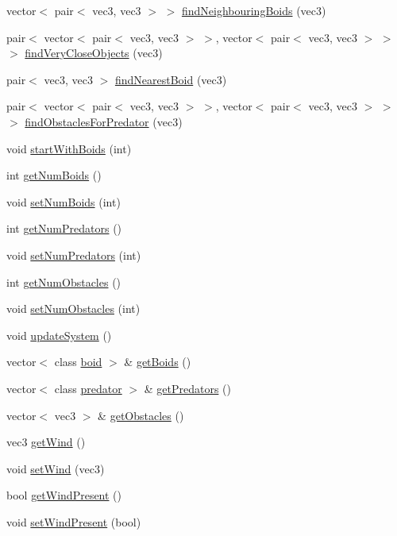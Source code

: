 \begin{DoxyCompactItemize}
\item 
vector$<$ pair$<$ vec3, vec3 $>$ $>$ \mbox{\hyperlink{classsystem_a2325f76474ccd70ecded65ec04816bb8}{find\+Neighbouring\+Boids}} (vec3)
\item 
pair$<$ vector$<$ pair$<$ vec3, vec3 $>$ $>$, vector$<$ pair$<$ vec3, vec3 $>$ $>$ $>$ \mbox{\hyperlink{classsystem_a213116ee6222958bd53c16dad4b49756}{find\+Very\+Close\+Objects}} (vec3)
\item 
pair$<$ vec3, vec3 $>$ \mbox{\hyperlink{classsystem_a3b4275e6878a46041c8fbd16a75dbcd6}{find\+Nearest\+Boid}} (vec3)
\item 
pair$<$ vector$<$ pair$<$ vec3, vec3 $>$ $>$, vector$<$ pair$<$ vec3, vec3 $>$ $>$ $>$ \mbox{\hyperlink{classsystem_aecaeaf720a0f4f7fc1a484359f0095c9}{find\+Obstacles\+For\+Predator}} (vec3)
\item 
void \mbox{\hyperlink{classsystem_afaa7d0f7cdf10d2fae3006fa8968faf6}{start\+With\+Boids}} (int)
\item 
int \mbox{\hyperlink{classsystem_af395f2699934146ba390133e024afc37}{get\+Num\+Boids}} ()
\item 
void \mbox{\hyperlink{classsystem_a5fb36e621729607b03513a73d4ebc7cf}{set\+Num\+Boids}} (int)
\item 
int \mbox{\hyperlink{classsystem_a10cfb00d926b669bd352fc9f77872e53}{get\+Num\+Predators}} ()
\item 
void \mbox{\hyperlink{classsystem_a5f11de22e04d7dc0e3530ba192230310}{set\+Num\+Predators}} (int)
\item 
int \mbox{\hyperlink{classsystem_a07f912943ebfac2bbc8497caca597c16}{get\+Num\+Obstacles}} ()
\item 
void \mbox{\hyperlink{classsystem_a98b6209781db025c0bdf7a0f37547082}{set\+Num\+Obstacles}} (int)
\item 
void \mbox{\hyperlink{classsystem_af33dc747b3b401f50beb14721b507e84}{update\+System}} ()
\item 
vector$<$ class \mbox{\hyperlink{classboid}{boid}} $>$ \& \mbox{\hyperlink{classsystem_afde340a58ca93892b9ded76a7763b2f8}{get\+Boids}} ()
\item 
vector$<$ class \mbox{\hyperlink{classpredator}{predator}} $>$ \& \mbox{\hyperlink{classsystem_ae640574f3de3538c33958a3f9d77d5ca}{get\+Predators}} ()
\item 
vector$<$ vec3 $>$ \& \mbox{\hyperlink{classsystem_a746b09f9814414e9d6b3eca935184707}{get\+Obstacles}} ()
\item 
vec3 \mbox{\hyperlink{classsystem_ac2e94ef9353084e3b3651189b052f993}{get\+Wind}} ()
\item 
void \mbox{\hyperlink{classsystem_a6de36540f491c1098abf14a8ea6a0396}{set\+Wind}} (vec3)
\item 
bool \mbox{\hyperlink{classsystem_a3efdff4ad0a66b21a7b284078584408d}{get\+Wind\+Present}} ()
\item 
void \mbox{\hyperlink{classsystem_aac2e508631be50e2de05b8cbe09c72f3}{set\+Wind\+Present}} (bool)
\end{DoxyCompactItemize}
